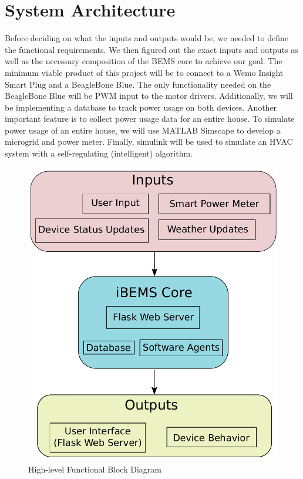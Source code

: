 \documentclass[letterpaper,12pt]{article}   %
\begin{document}
\section{System Architecture}
Before deciding on what the inputs and outputs would be, we needed to define the functional requirements. We then figured out the exact inputs and outputs as well as the necessary composition of the BEMS core to achieve our goal.
\medbreak\noindent
The minimum viable product of this project will be to connect to a Wemo Insight Smart Plug and a BeagleBone Blue. The only functionality needed on the BeagleBone Blue will be PWM input to the motor drivers. Additionally, we will be implementing a database to track power usage on both devices. Another important feature is to collect power usage data for an entire house. To simulate power usage of an entire house, we will use MATLAB Simscape to develop a microgrid and power meter. Finally, simulink will be used to simulate an HVAC system with a self-regulating (intelligent) algorithm.

\begin{figure}[H]
    \centering
    \includegraphics[scale=0.4]{figs/functionalBlockDiagram}
    \caption{High-level Functional Block Diagram}
    \label{fig:functionalBlockDiagram}
\end{figure}
\end{document}
